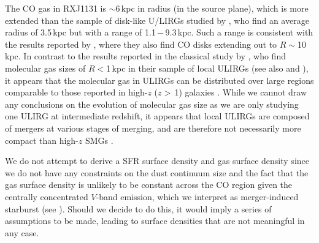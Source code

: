 \documentclass[]{emulateapj}
\begin{document}
The CO gas in RXJ1131 is $\sim$6\,kpc in radius (in the source plane),
which is more
extended than the sample of disk-like U/LIRGs studied by
\citet[hereafter U14]{Ueda14a}, who find an average radius of 3.5\,kpc but with a range of 1.1\,$-$\,9.3\,kpc.
Such a range is consistent with the results reported by \citet{Gao99a}, where
they also find CO disks extending out to $R\sim$10\,kpc.
In contrast to the results
reported in the classical study by
\citet[hereafter DS98]{Downes98a}, who find molecular gas sizes of $R<$1\,kpc in their sample of local ULIRGs
(see also \citealt{Bryant99a} and \citealt{Iono09a}), it appears that the molecular gas in ULIRGs
can be distributed over large regions comparable to
those reported in high-$z$ ($z$$>$\,1) galaxies \citep[$R\sim$7\,kpc;
;][]{Daddi10a, Riechers11a, Ivison11a}.
While we cannot draw any conclusions on the evolution of 
molecular gas size
as we are only studying one
ULIRG at intermediate redshift, it appears that local ULIRGs are composed of
mergers at various stages of merging, and are therefore not
necessarily more compact than
high-$z$ SMGs \citep[cf. \eg][]{Iono09a}.

We do not attempt to derive a SFR surface density and gas surface density
since we do not have any constraints on the dust continuum size
and the fact that
the gas surface density is unlikely to be constant across the CO region
given the centrally concentrated $V$-band emission, which we interpret as
merger-induced starburst (see ).
Should we decide to do this, it would imply
a series of assumptions to be made, leading to surface densities that are not
meaningful in any case.
\end{document}
